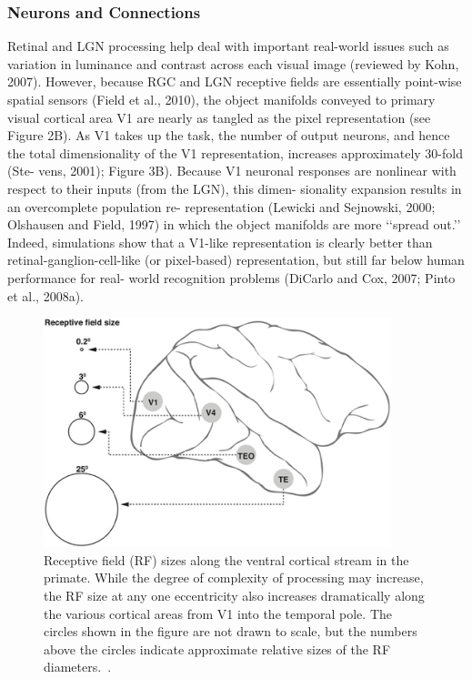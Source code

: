 \subsubsection{Neurons and Connections}
Retinal and LGN processing help deal with important real-world
issues such as variation in luminance and contrast across each
visual image (reviewed by Kohn, 2007). However, because
RGC and LGN receptive fields are essentially point-wise spatial
sensors (Field et al., 2010), the object manifolds conveyed to
primary visual cortical area V1 are nearly as tangled as the pixel
representation (see Figure 2B). As V1 takes up the task, the
number of output neurons, and hence the total dimensionality
of the V1 representation, increases approximately 30-fold (Ste-
vens, 2001); Figure 3B). Because V1 neuronal responses are
nonlinear with respect to their inputs (from the LGN), this dimen-
sionality expansion results in an overcomplete population re-
representation (Lewicki and Sejnowski, 2000; Olshausen and
Field, 1997) in which the object manifolds are more ‘‘spread
out.’’ Indeed, simulations show that a V1-like representation is
clearly better than retinal-ganglion-cell-like (or pixel-based)
representation, but still far below human performance for real-
world recognition problems (DiCarlo and Cox, 2007; Pinto
et al., 2008a).

\begin{figure}
	\centering
	\includegraphics[width=0.9\textwidth]{pics/rf.jpg}
	\caption{Receptive field (RF) sizes along the ventral cortical stream in the primate. While the degree of complexity of processing may increase, the RF size at any one eccentricity also increases dramatically along the various cortical areas from V1 into the temporal pole. The circles shown in the figure are not drawn to scale, but the numbers above the circles indicate approximate relative sizes of the RF diameters.~\cite{vidyasagar2013reading}.}
	\label{Fig:Hir1}
\end{figure}


